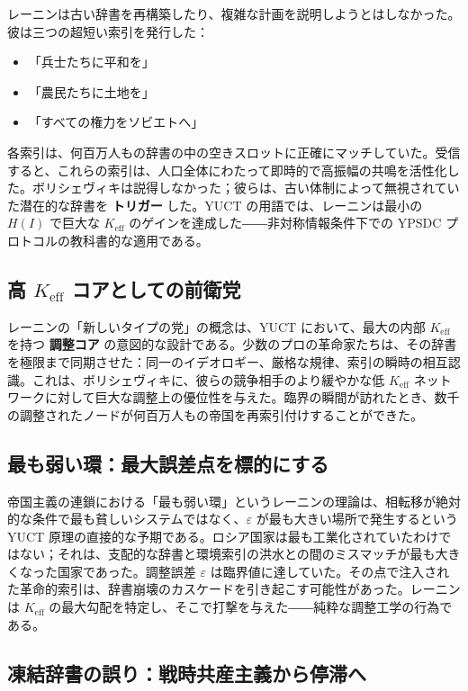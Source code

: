 \documentclass[12pt,a4paper]{article}
\newcommand{\Keff}{K_{\mathrm{eff}}}
\begin{document}
	レーニンは古い辞書を再構築したり、複雑な計画を説明しようとはしなかった。彼は三つの超短い索引を発行した：
	\begin{itemize}[leftmargin=*]
		\item 「兵士たちに平和を」
		\item 「農民たちに土地を」
		\item 「すべての権力をソビエトへ」
	\end{itemize}
	各索引は、何百万人もの辞書の中の空きスロットに正確にマッチしていた。受信すると、これらの索引は、人口全体にわたって即時的で高振幅の共鳴を活性化した。ボリシェヴィキは説得しなかった；彼らは、古い体制によって無視されていた潜在的な辞書を \textbf{トリガー} した。YUCT の用語では、レーニンは最小の \(H(I)\) で巨大な \(K_{\mathrm{eff}}\) のゲインを達成した――非対称情報条件下での YPSDC プロトコルの教科書的な適用である。
	
	\subsection{高 \(K_{\mathrm{eff}}\) コアとしての前衛党}
	
	レーニンの「新しいタイプの党」の概念は、YUCT において、最大の内部 \(K_{\mathrm{eff}}\) を持つ \textbf{調整コア} の意図的な設計である。少数のプロの革命家たちは、その辞書を極限まで同期させた：同一のイデオロギー、厳格な規律、索引の瞬時の相互認識。これは、ボリシェヴィキに、彼らの競争相手のより緩やかな低 \(K_{\mathrm{eff}}\) ネットワークに対して巨大な調整上の優位性を与えた。臨界の瞬間が訪れたとき、数千の調整されたノードが何百万人もの帝国を再索引付けすることができた。
	
	\subsection{最も弱い環：最大誤差点を標的にする}
	
	帝国主義の連鎖における「最も弱い環」というレーニンの理論は、相転移が絶対的な条件で最も貧しいシステムではなく、\(\varepsilon\) が最も大きい場所で発生するという YUCT 原理の直接的な予期である。ロシア国家は最も工業化されていたわけではない；それは、支配的な辞書と環境索引の洪水との間のミスマッチが最も大きくなった国家であった。調整誤差 \(\varepsilon\) は臨界値に達していた。その点で注入された革命的索引は、辞書崩壊のカスケードを引き起こす可能性があった。レーニンは \(\Keff\) の最大勾配を特定し、そこで打撃を与えた――純粋な調整工学の行為である。
	
	\subsection{凍結辞書の誤り：戦時共産主義から停滞へ}
	
\end{document}
